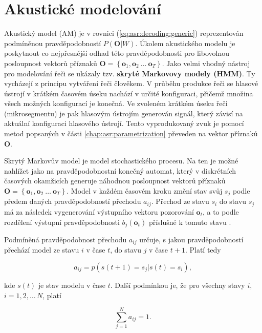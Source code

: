 \section{Akustické modelování}
\label{chap:asr:acoustic}

Akustický model (AM) je v rovnici (\ref{eq:asr:decoding:generic}) reprezentován podmíněnou pravděpodobností $P(\boldsymbol{O}|W)$. Úkolem akustického modelu je poskytnout co nejpřesnější odhad této pravděpodobnosti pro libovolnou posloupnost vektorů příznaků $\boldsymbol{O} = \left\{\boldsymbol{o}_1, \boldsymbol{o}_2\ \dots\ \boldsymbol{o}_T\right\}$. Jako velmi vhodný nástroj pro modelování řeči se ukázaly tzv. \textbf{skryté Markovovy modely (HMM)}. Ty vycházejí z principu vytváření řeči člověkem. V průběhu produkce řeči se hlasové ústrojí v krátkém časovém úseku nachází v určité konfiguraci, přičemž množina všech možných konfigurací je konečná. Ve zvoleném krátkém úseku řeči (mikrosegmentu) je pak hlasovým ústrojím generován signál, který závisí na aktuální konfiguraci hlasového ústrojí. Tento vyprodukovaný zvuk je pomocí metod popsaných v části \ref{chap:asr:parametrization} převeden na vektor příznaků $\boldsymbol{O}$.

Skrytý Markovův model je model stochastického procesu. Na ten je možné nahlížet jako na pravděpodobnostní konečný automat, který v diskrétních časových okamžicích generuje náhodnou posloupnost vektorů příznaků $\boldsymbol{O} = \left\{\boldsymbol{o}_1, \boldsymbol{o}_2\ \dots\ \boldsymbol{o}_T\right\}$. Model v každém časovém kroku změní stav svůj $s_j$ podle předem daných pravděpodobností přechodu $a_{ij}$. Přechod ze stavu $s_i$ do stavu $s_j$ má za následek vygenerování výstupního vektoru pozorování $\boldsymbol{o}_t$, a to podle rozdělení výstupní pravděpodobnosti $b_j\left(\boldsymbol{o}_t\right)$ příslušné k tomuto stavu \cite{Psutka2006}.

Podmíněná pravděpodobnost přechodu $a_{ij}$ určuje, s jakou pravděpodobností přechází model ze stavu $i$ v čase $t$, do stavu $j$ v čase $t+1$. Platí tedy

\begin{equation}
  a_{ij} = p\left(s\left(t+1\right)=s_j|s\left(t\right)=s_i\right),
  \label{eq:asr:acoustic:conditional}
\end{equation}

\noindent kde $s\left(t\right)$ je stav modelu v čase $t$. Další podmínkou je, že pro všechny stavy $i$, $i=1,2,\dots\,N$, platí

\begin{equation}
  \sum_{j=1}^{N} a_{ij} = 1.
  \label{eq:asr:acoustic:state:condition}
\end{equation}


